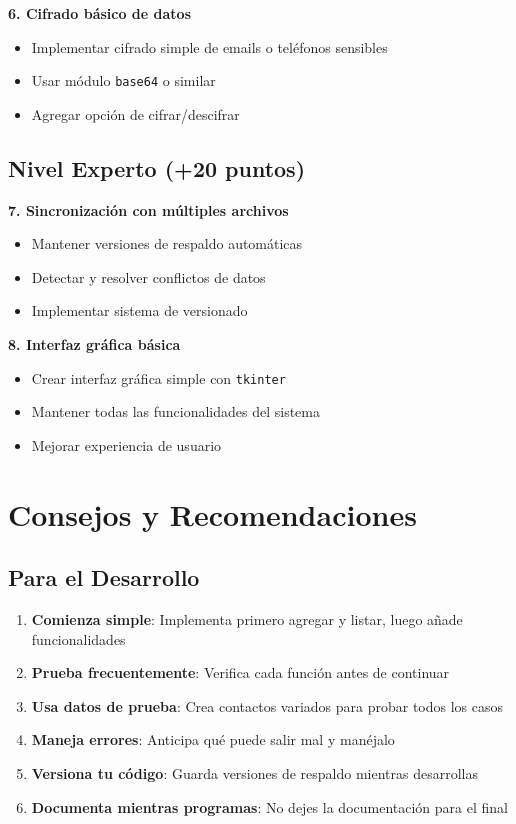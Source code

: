 \documentclass[11pt,letterpaper]{article}
\begin{document}
\textbf{6. Cifrado básico de datos}
\begin{itemize}
    \item Implementar cifrado simple de emails o teléfonos sensibles
    \item Usar módulo \texttt{base64} o similar
    \item Agregar opción de cifrar/descifrar
\end{itemize}

\subsection{Nivel Experto (+20 puntos)}

\textbf{7. Sincronización con múltiples archivos}
\begin{itemize}
    \item Mantener versiones de respaldo automáticas
    \item Detectar y resolver conflictos de datos
    \item Implementar sistema de versionado
\end{itemize}

\textbf{8. Interfaz gráfica básica}
\begin{itemize}
    \item Crear interfaz gráfica simple con \texttt{tkinter}
    \item Mantener todas las funcionalidades del sistema
    \item Mejorar experiencia de usuario
\end{itemize}

\section{Consejos y Recomendaciones}

\subsection{Para el Desarrollo}

\begin{enumerate}
    \item \textbf{Comienza simple}: Implementa primero agregar y listar, luego añade funcionalidades
    \item \textbf{Prueba frecuentemente}: Verifica cada función antes de continuar
    \item \textbf{Usa datos de prueba}: Crea contactos variados para probar todos los casos
    \item \textbf{Maneja errores}: Anticipa qué puede salir mal y manéjalo
    \item \textbf{Versiona tu código}: Guarda versiones de respaldo mientras desarrollas
    \item \textbf{Documenta mientras programas}: No dejes la documentación para el final
\end{enumerate}
\end{document}
